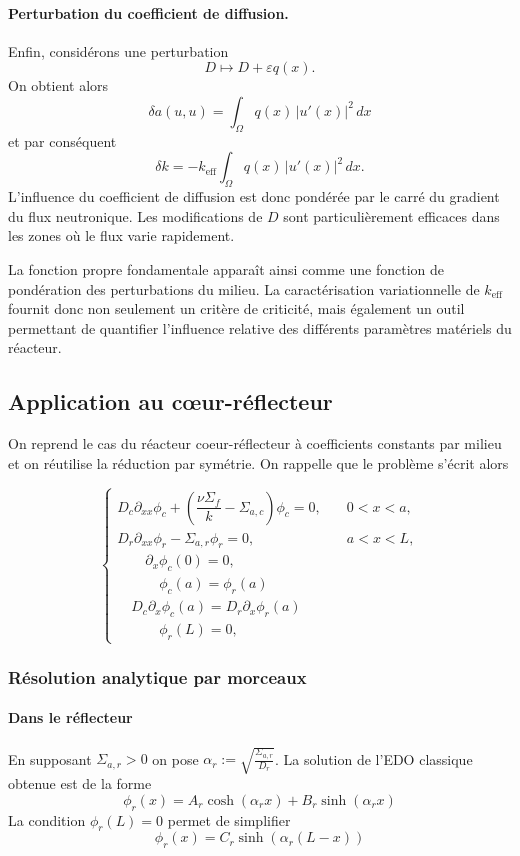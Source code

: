 \documentclass{article}
\newcommand{\keff}{k_{\mathrm{eff}}}
\begin{document}
\paragraph{Perturbation du coefficient de diffusion.} Enfin, considérons une perturbation
\[ D \longmapsto D+\varepsilon q(x). \]
On obtient alors 
\[ \delta a(u,u) = \int_\Omega q(x)\,|u'(x)|^2\,dx \] 
et par conséquent 
\[ \boxed{ \delta k = -k_{\mathrm{eff}} \int_\Omega q(x)\,|u'(x)|^2\,dx. } \]
L'influence du coefficient de diffusion est donc pondérée par le carré du gradient du flux neutronique. Les modifications de $D$ sont particulièrement efficaces dans les zones où le flux varie rapidement. 

\medskip
La fonction propre fondamentale apparaît ainsi comme une fonction de pondération des perturbations du milieu. La caractérisation variationnelle de $\keff$ fournit donc non seulement un critère de criticité, mais également un outil permettant de quantifier l'influence relative des différents paramètres matériels du réacteur.



\subsection{Application au cœur-réflecteur}
On reprend le cas du réacteur coeur-réflecteur à coefficients constants par milieu et on réutilise la réduction par symétrie. On rappelle que le problème s'écrit alors 

\[
\begin{cases}
D_c\partial_{xx}\phi_c + \left(\dfrac{\nu\Sigma_f}{k}-\Sigma_{a,c}\right)\phi_c = 0, \quad &0 < x <a, \\
D_r\partial_{xx}\phi_r - \Sigma_{a,r}\phi_r = 0, \quad &a < x <L, \\
\qquad \partial_x\phi_c(0) =0, \\ 
\quad \qquad \phi_c(a) = \phi_r(a)\\
\quad D_c\partial_x\phi_c(a) =D_r\partial_x\phi_r(a)  \\ 
\quad\qquad \phi_r(L) =0, 
\end{cases}
\]
\subsubsection{Résolution analytique par morceaux}

\paragraph{Dans le réflecteur}
En supposant $\Sigma_{a,r} > 0$ on pose $\alpha_r := \sqrt{\frac{\Sigma_{a,r}}{D_r}}$. La solution de l'EDO classique obtenue est de la forme 
\begin{equation*}
\phi_r(x) = A_r\cosh(\alpha_rx) + B_r\sinh(\alpha_rx)
\end{equation*}
La condition $\phi_r(L)=0$ permet de simplifier 
\begin{equation*}
\phi_r(x) = C_r\sinh(\alpha_r(L-x))
\end{equation*}
\end{document}
